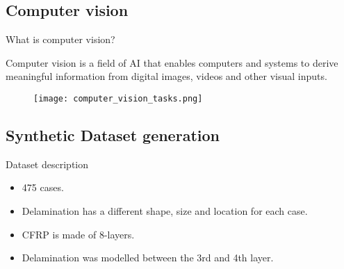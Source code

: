 \documentclass[10pt,aspectratio=169]{beamer} %
\begin{document}
\subsection{Computer vision}
\setcounter{subfigure}{0}
\begin{frame}{What is computer vision?}
	\begin{minipage}[c]{0.30\textwidth}
		Computer vision is a field of AI that enables computers and systems to derive meaningful information from digital images, videos and other visual inputs. 
	\end{minipage}
	\hfill
	\begin{minipage}[c]{0.65\textwidth}
		\begin{figure}
			\centering
			\texttt{[image: computer\_vision\_tasks.png]}
		\end{figure}
	\end{minipage}
\end{frame}
\subsection{Synthetic Dataset generation}
\setcounter{subfigure}{0}
\begin{frame}{Dataset description}
	\centering
	\begin{minipage}[c]{0.35\textwidth}
		\begin{itemize}
			\justifying
			\item 475 cases.
			\item Delamination has a different shape, size and location for each case.
			\item CFRP is made of 8-layers.
			\item Delamination was modelled between the 3rd and 4th layer.			
		\end{itemize}
	\end{minipage}
	\hfill
	\begin{minipage}[c]{0.6\textwidth}
		\begin{figure}
			\centering			
			\qquad
		\end{figure}
	\end{minipage}
\end{frame}
\end{document}
